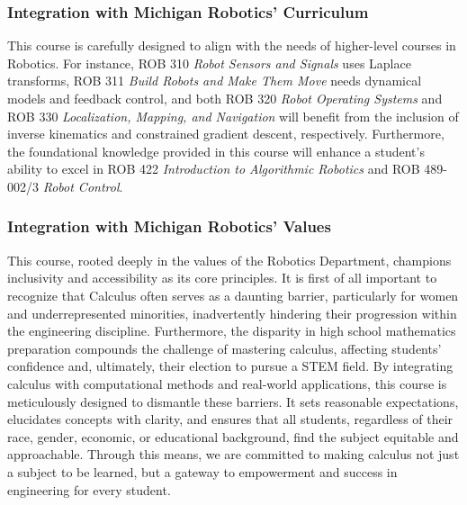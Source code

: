 \subsubsection{Integration with Michigan Robotics' Curriculum}

This course is carefully designed to align with the needs of higher-level courses in Robotics. For instance, ROB 310 \textit{Robot Sensors and Signals} uses Laplace transforms, ROB 311 \textit{Build Robots and Make Them Move} needs dynamical models and feedback control, and both ROB 320 \textit{Robot Operating Systems} and ROB 330 \textit{Localization, Mapping, and Navigation} will benefit from the inclusion of inverse kinematics and constrained gradient descent, respectively. Furthermore, the foundational knowledge provided in this course will enhance a student's ability to excel in ROB 422 \textit{Introduction to Algorithmic Robotics} and ROB 489-002/3 \textit{Robot Control}.

\subsubsection{Integration with Michigan Robotics' Values}


This course, rooted deeply in the values of the Robotics Department, champions inclusivity and accessibility as its core principles. It is first of all important to recognize that Calculus often serves as a daunting barrier, particularly for women and underrepresented minorities, inadvertently hindering their progression within the engineering discipline. Furthermore, the disparity in high school mathematics preparation compounds the challenge of mastering calculus, affecting students' confidence and, ultimately, their election to pursue a STEM field. By integrating calculus with computational methods and real-world applications, this course is meticulously designed to dismantle these barriers. It sets reasonable expectations, elucidates concepts with clarity, and ensures that all students, regardless of their race, gender, economic, or educational background, find the subject equitable and approachable. Through this means, we are committed to making calculus not just a subject to be learned, but a gateway to empowerment and success in engineering for every student.

